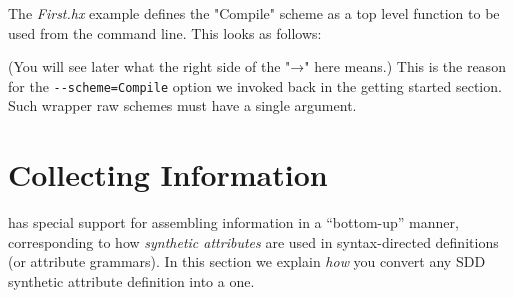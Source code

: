 \documentclass[11pt]{article} %
\begin{document}
\begin{example}
  The \emph{First.hx} example defines the "Compile" scheme as a top level function to be used from
  the command line. This looks as follows:
  (You will see later what the right side of the "→" here means.)  This is the reason for the
  \verb|--scheme=Compile| option we invoked back in the getting started section.  Such wrapper raw
  schemes must have a single argument.
\end{example}


\section{Collecting Information}
\label{sec:collect}

\HAX has special support for assembling information in a ``bottom-up'' manner, corresponding to how
\emph{synthetic attributes} are used in syntax-directed definitions (or attribute grammars).  In
this section we explain \emph{how} you convert any SDD synthetic attribute definition into a \HAX
one.
\end{document}
